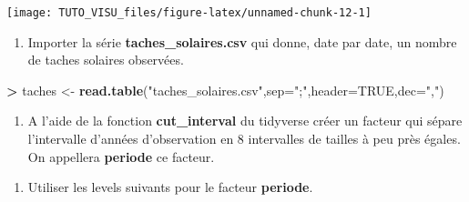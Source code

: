\documentclass[]{article}
\newenvironment{Shaded}{\begin{snugshade}}{\end{snugshade}}
\newcommand{\DataTypeTok}[1]{\textcolor[rgb]{0.13,0.29,0.53}{#1}}
\newcommand{\DecValTok}[1]{\textcolor[rgb]{0.00,0.00,0.81}{#1}}
\newcommand{\KeywordTok}[1]{\textcolor[rgb]{0.13,0.29,0.53}{\textbf{#1}}}
\newcommand{\NormalTok}[1]{#1}
\newcommand{\OperatorTok}[1]{\textcolor[rgb]{0.81,0.36,0.00}{\textbf{#1}}}
\newcommand{\OtherTok}[1]{\textcolor[rgb]{0.56,0.35,0.01}{#1}}
\newcommand{\StringTok}[1]{\textcolor[rgb]{0.31,0.60,0.02}{#1}}
\providecommand{\tightlist}{%
  \setlength{\itemsep}{0pt}\setlength{\parskip}{0pt}}
\theoremstyle{definition}
\theoremstyle{definition}
\theoremstyle{definition}
\theoremstyle{remark}
\let\BeginKnitrBlock\begin \let\EndKnitrBlock\end
\begin{document}
\begin{center}\texttt{[image: TUTO\_VISU\_files/figure-latex/unnamed-chunk-12-1]} \end{center}

\BeginKnitrBlock{exercise}[Tâches solaires]
\protect\hypertarget{exr:exo3}{}{\label{exr:exo3} \iffalse (Tâches solaires) \fi{} }
\EndKnitrBlock{exercise}

\begin{enumerate}
\def\labelenumi{\arabic{enumi}.}
\tightlist
\item
  Importer la série \textbf{taches\_solaires.csv} qui donne, date par date, un nombre de taches solaires observées.
\end{enumerate}

\begin{Shaded}
\begin{Highlighting}[]
\OperatorTok{>}\StringTok{ }\NormalTok{taches <-}\StringTok{ }\KeywordTok{read.table}\NormalTok{(}\StringTok{"taches_solaires.csv"}\NormalTok{,}\DataTypeTok{sep=}\StringTok{";"}\NormalTok{,}\DataTypeTok{header=}\OtherTok{TRUE}\NormalTok{,}\DataTypeTok{dec=}\StringTok{","}\NormalTok{)}
\end{Highlighting}
\end{Shaded}

\begin{enumerate}
\def\labelenumi{\arabic{enumi}.}
\setcounter{enumi}{1}
\tightlist
\item
  A l'aide de la fonction \textbf{cut\_interval} du tidyverse créer un facteur qui sépare l'intervalle d'années d'observation en 8 intervalles de tailles à peu près égales. On appellera \textbf{periode} ce facteur.
\end{enumerate}

\begin{Shaded}
\end{Shaded}

\begin{enumerate}
\def\labelenumi{\arabic{enumi}.}
\setcounter{enumi}{2}
\tightlist
\item
  Utiliser les levels suivants pour le facteur \textbf{periode}.
\end{enumerate}
\end{document}
